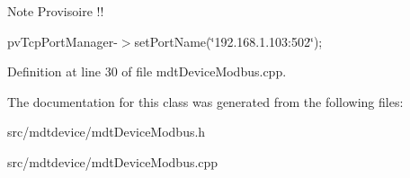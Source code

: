 \begin{DoxyNote}{Note}
Provisoire !!
\end{DoxyNote}
pvTcpPortManager-\/$>$setPortName(\char`\"{}192.168.1.103:502\char`\"{}); 



Definition at line 30 of file mdtDeviceModbus.cpp.



The documentation for this class was generated from the following files:\begin{DoxyCompactItemize}
\item 
src/mdtdevice/mdtDeviceModbus.h\item 
src/mdtdevice/mdtDeviceModbus.cpp\end{DoxyCompactItemize}
